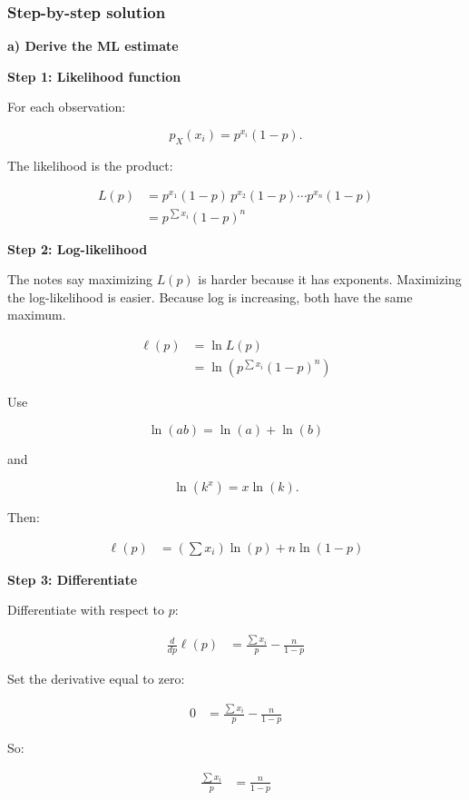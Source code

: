 \documentclass[10pt]{article}
\begin{document}
\subsubsection*{Step-by-step solution}

\textbf{a) Derive the ML estimate}

\textbf{Step 1: Likelihood function}

For each observation:

\[
p_X(x_i)=p^{x_i}(1-p).
\]

The likelihood is the product:

\begin{align*}
L(p)
&=
p^{x_1}(1-p)\,
p^{x_2}(1-p)\cdots
p^{x_n}(1-p) \\[2mm]
&=
p^{\sum x_i}(1-p)^n
\end{align*}

\textbf{Step 2: Log-likelihood}

The notes say maximizing $L(p)$ is harder because it has exponents.
Maximizing the log-likelihood is easier.
Because log is increasing, both have the same maximum.

\begin{align*}
\ell(p)
&=
\ln L(p) \\[2mm]
&=
\ln\!\left(
p^{\sum x_i}(1-p)^n
\right)
\end{align*}

Use

\[
\ln(ab)=\ln(a)+\ln(b)
\]

and

\[
\ln(k^x)=x\ln(k).
\]

Then:

\begin{align*}
\ell(p)
&=
\left(\sum x_i\right)\ln(p)
+n\ln(1-p)
\end{align*}

\textbf{Step 3: Differentiate}

Differentiate with respect to $p$:

\begin{align*}
\frac{d}{dp}\ell(p)
&=
\frac{\sum x_i}{p}
-\frac{n}{1-p}
\end{align*}

Set the derivative equal to zero:

\begin{align*}
0
&=
\frac{\sum x_i}{p}
-\frac{n}{1-p}
\end{align*}

So:

\begin{align*}
\frac{\sum x_i}{p}
&=
\frac{n}{1-p}
\end{align*}
\end{document}
